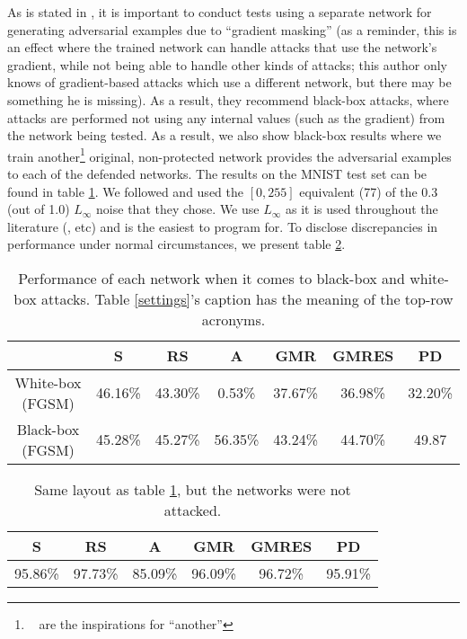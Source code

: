 As is stated in \cite{athalye2018obfuscated}, it is important to conduct tests using a separate
network for generating adversarial examples due to ``gradient masking'' (as a reminder, this is an
effect where the trained network can handle attacks that use the network's gradient, while not being
able to handle other kinds of attacks; this author only knows of gradient-based attacks which use a
different network, but there may be something he is missing). As a result, they recommend black-box
attacks, where attacks are performed not using any internal values (such as the gradient) from the
network being tested. As a result, we also show black-box results where we train
another\footnote{~\cite{madry2019deep, szegedy2014intriguing} are the inspirations for ``another''}
original, non-protected network provides the adversarial examples to each of the defended networks.
The results on the MNIST test set can be found in table \ref{defensiveproficiency}. We followed
\cite{madry2019deep} and used the $[0, 255]$ equivalent (77) of the 0.3 (out of 1.0) $L_\infty$
noise that they chose. We use $L_{\infty}$ as it is used throughout the literature
(\cite{goodfellow2015explaining, madry2019deep, tramèr2020ensemble}, etc) and is the easiest to
program for. To disclose discrepancies in performance under normal circumstances, we present table
\ref{clean}.

\begin{table}
    \begin{center}
        \begin{tabular}{| c | c | c | c | c | c | c |}
            \hline
                             &      S      &    RS     &    A     &   GMR     &   GMRES   &   PD     \\
            \hline
            White-box (FGSM) &  46.16\%    &  43.30\%  &  0.53\%  &  37.67\%  &  36.98\%  &  32.20\% \\
            Black-box (FGSM) &  45.28\%    &  45.27\%  &  56.35\% &  43.24\%  &  44.70\%  &  49.87   \\
            \hline
        \end{tabular}
    \end{center}
    \caption{Performance of each network when it comes to black-box and white-box attacks.
             Table \ref{settings}'s caption has the meaning of the top-row acronyms.}
    \label{defensiveproficiency}
\end{table}

\begin{table}
    \begin{center}
        \begin{tabular}{| c | c | c | c | c | c |}
            \hline
            S        &     RS    &     A     &   GMR    &   GMRES   &   PD     \\
            \hline
            95.86\%  &  97.73\%  &  85.09\%  &  96.09\% &  96.72\%  &  95.91\% \\
            \hline
        \end{tabular}
    \end{center}
    \caption{Same layout as table \ref{defensiveproficiency}, but the networks were not attacked.}
    \label{clean}
\end{table}

